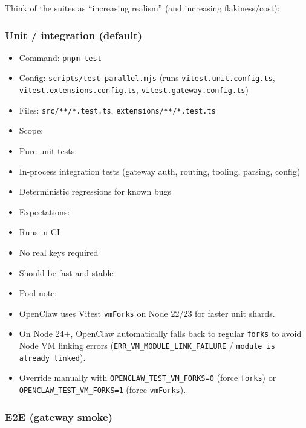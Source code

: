 Think of the suites as “increasing realism” (and increasing flakiness/cost):

\subsubsection{Unit / integration (default)}


\begin{itemize}
  \item Command: \texttt{pnpm test}
  \item Config: \texttt{scripts/test-parallel.mjs} (runs \texttt{vitest.unit.config.ts}, \texttt{vitest.extensions.config.ts}, \texttt{vitest.gateway.config.ts})
  \item Files: \texttt{src/**/*.test.ts}, \texttt{extensions/**/*.test.ts}
  \item Scope:
  \item Pure unit tests
  \item In-process integration tests (gateway auth, routing, tooling, parsing, config)
  \item Deterministic regressions for known bugs
  \item Expectations:
  \item Runs in CI
  \item No real keys required
  \item Should be fast and stable
  \item Pool note:
  \item OpenClaw uses Vitest \texttt{vmForks} on Node 22/23 for faster unit shards.
  \item On Node 24+, OpenClaw automatically falls back to regular \texttt{forks} to avoid Node VM linking errors (\texttt{ERR\_VM\_MODULE\_LINK\_FAILURE} / \texttt{module is already linked}).
  \item Override manually with \texttt{OPENCLAW\_TEST\_VM\_FORKS=0} (force \texttt{forks}) or \texttt{OPENCLAW\_TEST\_VM\_FORKS=1} (force \texttt{vmForks}).
\end{itemize}


\subsubsection{E2E (gateway smoke)}


